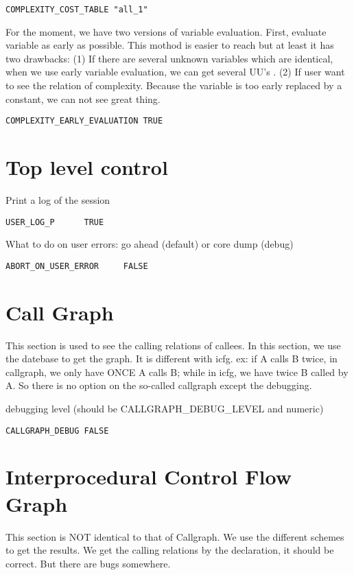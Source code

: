 \begin{verbatim}
COMPLEXITY_COST_TABLE "all_1"
\end{verbatim}

For the moment, we have two versions of variable evaluation. First,
evaluate variable as early as possible. This mothod is easier to reach
but at least it has two drawbacks: (1) If there are several unknown
variables which are identical, when we use early variable evaluation, we
can get several UU's . (2) If user want to see the relation of
complexity. Because the variable is too early replaced by a constant, we
can not see great thing.

\begin{verbatim}
COMPLEXITY_EARLY_EVALUATION TRUE
\end{verbatim}

\section{Top level control}

Print a log of the session

\begin{verbatim}
USER_LOG_P      TRUE
\end{verbatim}

What to do on user errors: go ahead (default) or core dump (debug)

\begin{verbatim}
ABORT_ON_USER_ERROR     FALSE
\end{verbatim}

\section{Call Graph}
This section is used to see the calling relations of callees.
In this section,
we use the datebase to get the graph. It is different with icfg.
ex: if A calls B twice, in callgraph, we only have ONCE A calls B;
while in icfg, we have twice B called by A.
So there is no option on the so-called callgraph except the debugging.

debugging level (should be CALLGRAPH\_DEBUG\_LEVEL and numeric)

\begin{verbatim}
CALLGRAPH_DEBUG FALSE
\end{verbatim}

\section{Interprocedural Control Flow Graph}
This section is NOT identical to that of Callgraph. 
We use the different schemes to get the results.
We get the calling relations by the declaration, it should be correct.
But there are bugs somewhere.

